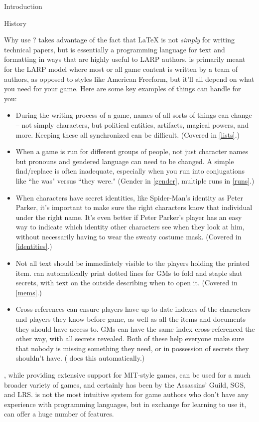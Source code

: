 \documentclass[sheet]{GameTexBase}
\begin{document}
\begin{section}{Introduction}
\begin{subsection}{History}
\end{subsection}
\begin{subsection}{Why use \gametex{}?}
\gametex{} takes advantage of the fact that \LaTeX{} is not \textit{simply} for writing technical papers, but is essentially a programming language for text and formatting in ways that are highly useful to LARP authors.
\gametex{} is primarily meant for the LARP model where most or all game content is written by a team of authors, as opposed to styles like American Freeform, but it'll all depend on what you need for your game.
Here are some key examples of things \gametex{} can handle for you:
\begin{itemize}
    \item During the writing process of a game, names of all sorts of things can change – not simply characters, but political entities, artifacts, magical powers, and more.  Keeping these all synchronized can be difficult.  (Covered in \ref{lists}.)
    \item When a game is run for different groups of people, not just character names but pronouns and gendered language can need to be changed.  A simple find/replace is often inadequate, especially when you run into conjugations like ``he was" versus ``they were."  (Gender in \ref{gender}, multiple runs in \ref{runs}.)
		\item When characters have secret identities, like Spider-Man's identity as Peter Parker, it's important to make sure the right characters know that individual under the right name.  It's even better if Peter Parker's player 
		has an easy way to indicate which identity other characters see when they look at him, without necessarily having to wear the sweaty costume mask.  (Covered in \ref{identities}.)
    \item Not all text should be immediately visible to the players holding the printed item.  \gametex{} can automatically print dotted lines for GMs to fold and staple shut secrets, with text on the outside describing when to open it.  (Covered in \ref{mems}.)
    \item Cross-references can ensure players have up-to-date indexes of the characters and players they know before game, as well as all the items and documents they should have access to.  GMs can have the same index cross-referenced the other way, with all secrets revealed.  Both of these help everyone make sure that nobody is missing something they need, or in possession of secrets they shouldn't have.  (\gametex{} does this automatically.)
\end{itemize}
\gametex{}, while providing extensive support for MIT-style games, can be used for a much broader variety of games, and certainly has been by the Assassins' Guild, SGS, and LRS.  
\gametex{} is not the most intuitive system for game authors who don't have any experience with programming languages, but in exchange for learning to use it, \gametex{} can offer a huge number of features.


\end{subsection}
\end{section}
\end{document}
